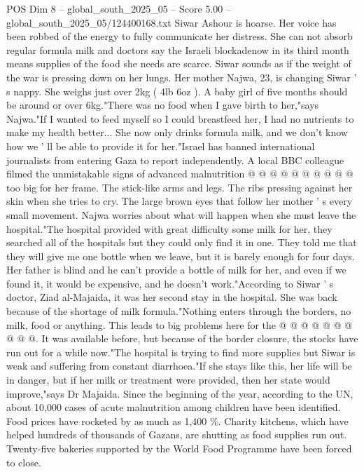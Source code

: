 \begin{textsample}{POS Dim 8 – global\_south\_2025\_05 – Score 5.00 – global\_south\_2025\_05/124400168.txt}  \label{ex:f8_pos_139}
Siwar Ashour is hoarse.
Her voice has been robbed of the energy to fully communicate her distress.
She can not absorb regular formula milk and doctors say the Israeli blockadenow in its third month means supplies of the food she needs are scarce.
Siwar sounds as if the weight of the war is pressing down on her lungs.
Her mother Najwa, 23, is changing Siwar ' s nappy.
She weighs just over 2kg ( 4lb 6oz ).
A baby girl of five months should be around or over 6kg."There was no food when I gave birth to her,"says Najwa."If I wanted to feed myself so I could breastfeed her, I had no nutrients to make my health better...
She now only drinks formula milk, and we don't know how we ' ll be able to provide it for her."Israel has banned international journalists from entering Gaza to report independently.
A local BBC colleague filmed the unmistakable signs of advanced malnutrition @ @ @ @ @ @ @ @ @ @ too big for her frame.
The stick-like arms and legs.
The ribs pressing against her skin when she tries to cry.
The large brown eyes that follow her mother ' s every small movement.
Najwa worries about what will happen when she must leave the hospital."The hospital provided with great difficulty some milk for her, they searched all of the hospitals but they could only find it in one.
They told me that they will give me one bottle when we leave, but it is barely enough for four days.
Her father is blind and he can't provide a bottle of milk for her, and even if we found it, it would be expensive, and he doesn't work."According to Siwar ' s doctor, Ziad al-Majaida, it was her second stay in the hospital.
She was back because of the shortage of milk formula."Nothing enters through the borders, no milk, food or anything.
This leads to big problems here for the @ @ @ @ @ @ @ @ @ @.
It was available before, but because of the border closure, the stocks have run out for a while now."The hospital is trying to find more supplies but Siwar is weak and suffering from constant diarrhoea."If she stays like this, her life will be in danger, but if her milk or treatment were provided, then her state would improve,"says Dr Majaida.
Since the beginning of the year, according to the UN, about 10,000 cases of acute malnutrition among children have been identified.
Food prices have rocketed by as much as 1,400 \%.
Charity kitchens, which have helped hundreds of thousands of Gazans, are shutting as food supplies run out.
Twenty-five bakeries supported by the World Food Programme have been forced to close.

\end{textsample}

